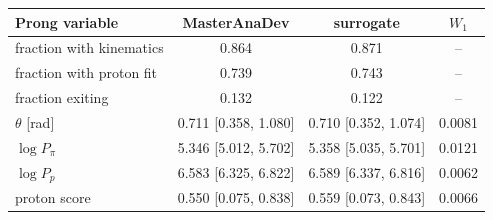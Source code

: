 \begin{tabular}{lccc}
\toprule
Prong variable & MasterAnaDev & surrogate & $W_1$ \\
\midrule
fraction with kinematics & 0.864 & 0.871 & -- \\
fraction with proton fit & 0.739 & 0.743 & -- \\
fraction exiting & 0.132 & 0.122 & -- \\
$\theta$ [rad] & 0.711 [0.358, 1.080] & 0.710 [0.352, 1.074] & 0.0081 \\
$\log P_\pi$ & 5.346 [5.012, 5.702] & 5.358 [5.035, 5.701] & 0.0121 \\
$\log P_p$ & 6.583 [6.325, 6.822] & 6.589 [6.337, 6.816] & 0.0062 \\
proton score & 0.550 [0.075, 0.838] & 0.559 [0.073, 0.843] & 0.0066 \\
\bottomrule
\end{tabular}
